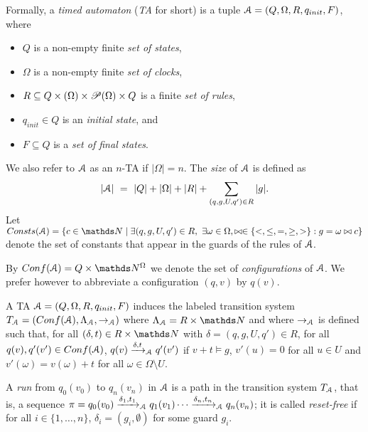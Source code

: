 \par\noindent\ignorespacesafterend
Formally, a {\em timed automaton} ({\em TA} for short) is a tuple
$\mathcal{A}=(Q,\Omega,R,q_{init},F)$, where
\begin{samepage}
\begin{itemize}
	\item $Q$ is a non-empty finite {\em set of states}, 
	\item $\Omega$ is a non-empty finite {\em set of clocks},
	\item $R \subseteq Q\times\relax(\Omega)\times \mathscr{P}(\Omega) \times Q$
	is a finite {\em set of  rules},
	\item $q_{init}\in Q$ is an {\em initial  state}, and 
	\item $F\subseteq Q$ is a {\em set of final states}.
\end{itemize}
\end{samepage}

\par\noindent\ignorespacesafterend
We also refer to $\mathcal{A}$ as an $n$-TA if $|\Omega| = n$. 
The {\em size} of $\mathcal{A}$ is defined as%
$$
|\A| \ = \ |Q|+|\Omega|+|R|+\sum_{(q,g,U,q')\in R}|g|.
$$
Let 
$\Const(\A) = \{ c\in\N \mid \exists(q,g,U,q')\in R, \ \exists \omega \in \Omega, \bowtie\in\{<,\leq,=,\geq,>\} : g = \omega \bowtie c \}$ denote the 
set of constants that appear in the guards of the rules of $\mathcal{A}$.

By $\Conf(\A)=Q\times\N^\Omega$ we denote the set of
{\em configurations} of $\mathcal{A}$. 
We prefer however to abbreviate a configuration	%
$(q,v)$ by $q(v)$.


\begin{samepage}
A TA $\mathcal{A}=(Q,\Omega,R,q_{init},F)$ induces the labeled transition system 
$T_{\A} =  (\Conf(\A), \Lambda_{\A}, \rightarrow_{\A})$
where $ \Lambda_{\A} = R \times \N $
and 
where $ \rightarrow_{\mathcal{A}}$ is defined such that, 
for all $(\delta,t)\in R\times\N$ with  	$\delta = (q,g,U,q')\in R$,
for all $q(v), q'(v') \in \Conf(\A)$,
$q(v)\xrightarrow{\delta,t}_{\mathcal{A}} q'(v')$ if
	$v+t\models g$, 
	 $v'(u)=0$ for all $u \in U$ and $v'(\omega)=v(\omega)+t$ for all 
	$\omega \in \Omega \setminus U$.
\end{samepage}

A {\em run} from $q_0(v_0)$ to $q_n(v_n)$ in $\mathcal{A}$ is a path in the transition system $T_{\mathcal{A}}$, that is,
a sequence 
$\pi = q_0(v_0)\xrightarrow{\delta_1,t_1}_{\mathcal{A}}q_1(v_1)\cdots\xrightarrow{\delta_n,t_n}_{\mathcal{A}}q_n(v_n)$;
it is called {\em reset-free} if for all $i \in \{1,\ldots,n\}$,
 $\delta_i = (g_i,\emptyset)$ for some guard $g_i$.


